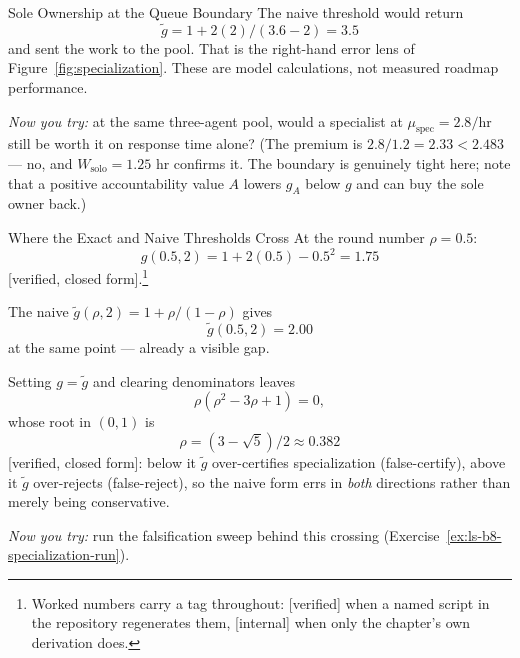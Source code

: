 \documentclass[11pt,a4paper]{article}
\theoremstyle{definition}
\theoremstyle{plain}
\begin{document}
\begin{pdexample}{Sole Ownership at the Queue Boundary}
The naive threshold would return
\[
\tilde g = 1 + 2(2)/(3.6-2) = 3.5
\]
and sent the work to the pool. That is the
right-hand error lens of Figure~\ref{fig:specialization}. These are model
calculations, not measured roadmap performance.

\emph{Now you try:} at the same three-agent pool, would a specialist at
$\mu_{\mathrm{spec}} = 2.8/\text{hr}$ still be worth it on response time alone?
(The premium is $2.8/1.2 = 2.33 < 2.483$ --- no, and $W_{\mathrm{solo}} = 1.25$ hr
confirms it. The boundary is genuinely tight here; note that a positive
accountability value $A$ lowers $g_A$ below $g$ and can buy the sole owner back.)
\end{pdexample}

\begin{pdexample}{Where the Exact and Naive Thresholds Cross}
\setlength{\parskip}{4pt plus 1pt}
At the round number $\rho=0.5$:
\[
g(0.5,2)=1+2(0.5)-0.5^2=1.75
\]
[verified, closed form].\footnote{Worked numbers carry a tag throughout: [verified] when a named script in the repository regenerates them, [internal] when only the chapter's own derivation does.}

The naive $\tilde g(\rho,2)=1+\rho/(1-\rho)$ gives
\[
\tilde g(0.5,2)=2.00
\]
at the same point --- already a visible gap.

Setting $g=\tilde g$ and clearing denominators leaves
\[
\rho(\rho^2-3\rho+1)=0,
\]
whose root in $(0,1)$ is
\[
\rho=(3-\sqrt5)/2\approx0.382
\]
[verified, closed form]: below it $\tilde g$ over-certifies \mbox{specialization} (false-certify), above it $\tilde g$ over-rejects (false-reject), so the naive form errs in \emph{both} directions rather than merely being conservative.

\emph{Now you try:} run the falsification sweep behind this crossing (Exercise~\ref{ex:ls-b8-specialization-run}).
\end{pdexample}



\end{document}
